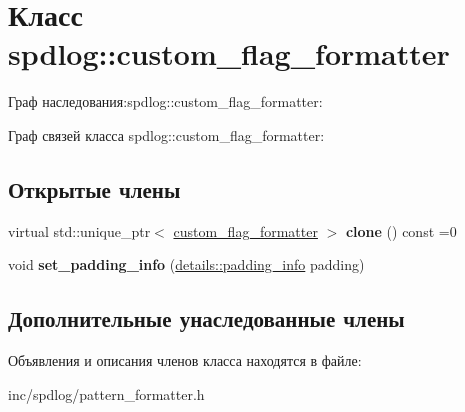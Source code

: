\hypertarget{classspdlog_1_1custom__flag__formatter}{}\section{Класс spdlog\+:\+:custom\+\_\+flag\+\_\+formatter}
\label{classspdlog_1_1custom__flag__formatter}


Граф наследования\+:spdlog\+:\+:custom\+\_\+flag\+\_\+formatter\+:


Граф связей класса spdlog\+:\+:custom\+\_\+flag\+\_\+formatter\+:
\subsection*{Открытые члены}
\begin{DoxyCompactItemize}
\item 
\mbox{\label{classspdlog_1_1custom__flag__formatter_aeba80decf1bee2c4e4375ca349fc5eaf}} 
virtual std\+::unique\+\_\+ptr$<$ \hyperlink{classspdlog_1_1custom__flag__formatter}{custom\+\_\+flag\+\_\+formatter} $>$ {\bfseries clone} () const =0
\item 
\mbox{\label{classspdlog_1_1custom__flag__formatter_a8f88d74304082b4c74b35ab29a587166}} 
void {\bfseries set\+\_\+padding\+\_\+info} (\hyperlink{structspdlog_1_1details_1_1padding__info}{details\+::padding\+\_\+info} padding)
\end{DoxyCompactItemize}
\subsection*{Дополнительные унаследованные члены}


Объявления и описания членов класса находятся в файле\+:\begin{DoxyCompactItemize}
\item 
inc/spdlog/pattern\+\_\+formatter.\+h\end{DoxyCompactItemize}
